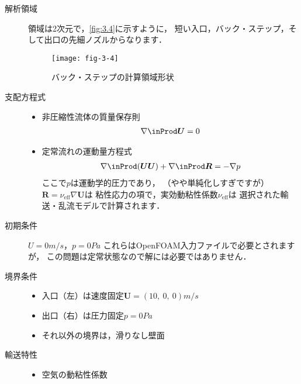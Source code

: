 \begin{description}
 \item[解析領域] 領域は2次元で，\autoref{fig:3.4}に示すように，
            短い入口，バック・ステップ，そして出口の先細ノズルからなります．


\begin{figure}[ht]
 \texttt{[image: fig-3-4]}
 \caption{バック・ステップの計算領域形状}
 \label{fig:3.4}
\end{figure}


 \item[支配方程式] \mbox{}
            \begin{itemize}
             \item 非圧縮性流体の質量保存則
                   \begin{align}
                    \label{eq:3.3}
                    \nabla \inProd \bm{U} = 0
                   \end{align}
             \item 定常流れの運動量方程式
                   \begin{align}
                    \label{eq:3.4}
                    \nabla \inProd (\bm{U}\bm{U}) + \nabla \inProd \bm{R} = -\nabla p
                   \end{align}
                   ここで$p$は運動学的圧力であり，
                   （やや単純化しすぎですが）$\bm{R} = \nu_{\mathrm{eff}}\nabla\bm{U}$は
                   粘性応力の項で，実効動粘性係数$\nu_{\mathrm{eff}}$は
                   選択された輸送・乱流モデルで計算されます．
            \end{itemize}
 \item[初期条件] $U = 0 \unit{m/s}$，$p = 0 \unit{Pa}$\jdash
            これらはOpenFOAM入力ファイルで必要とされますが，
            この問題は定常状態なので解には必要ではありません．
 \item[境界条件] \mbox{}
            \begin{itemize}
             \item 入口（左）は速度固定$\bm{U} = (10,\ 0,\ 0) \unit{m/s}$
             \item 出口（右）は圧力固定$p = 0 \unit{Pa}$
             \item それ以外の境界は，滑りなし壁面
            \end{itemize}
 \item[輸送特性] \mbox{}
            \begin{itemize}
             \item 空気の動粘性係数

\end{itemize}
\end{description}
